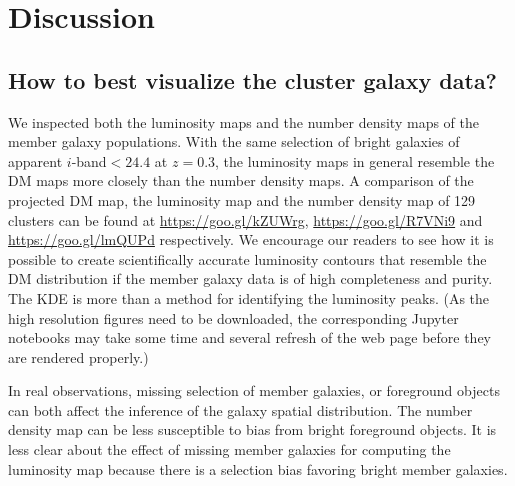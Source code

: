 % 
 
 
 
\section{Discussion}\label{sec:discussion}

\subsection{How to best visualize the cluster galaxy data?}
We inspected both the luminosity maps and the
number density maps of the member galaxy populations.
With the same selection of bright galaxies of apparent $i$-band$ < 24.4$ at
$z=0.3$, the luminosity maps in general resemble the DM maps more closely than 
the number density maps.
A comparison of the projected 
DM map, the luminosity map and the number density map of 129 clusters 
can be found at \href{https://goo.gl/kZUWrg}{https://goo.gl/kZUWrg}, 
\href{https://goo.gl/R7VNi9}{https://goo.gl/R7VNi9} and
\href{https://goo.gl/lmQUPd}{https://goo.gl/lmQUPd} respectively. 
We encourage our readers to see how it is possible
to create scientifically accurate luminosity contours that resemble 
the DM distribution if the member galaxy
data is of high completeness and purity. The KDE is more than a method for
identifying the luminosity peaks.
(As the high resolution figures need to be downloaded, the 
corresponding Jupyter notebooks may take some time and several refresh of the
web page before they are rendered properly.)

In real observations, missing selection of member galaxies, or 
foreground objects can both affect the inference of the galaxy spatial 
distribution. The number density map can be less susceptible to bias from bright 
foreground objects. It is less clear about the effect of missing member galaxies 
for computing the luminosity map because there is a selection bias favoring 
bright member galaxies.

